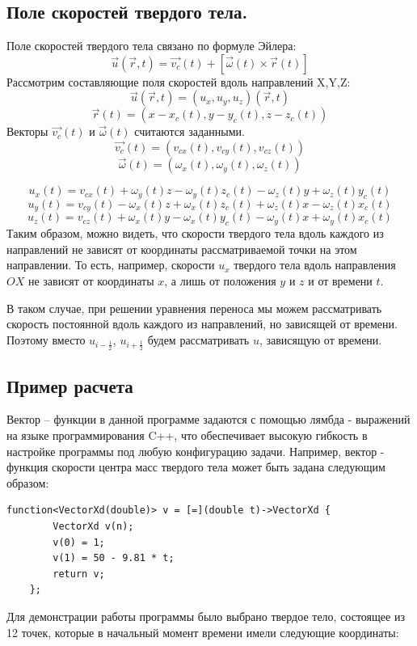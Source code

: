\documentclass[12pt,a4paper]{article}
\begin{document}
\subsection{Поле скоростей твердого тела.}
Поле скоростей твердого тела связано по формуле Эйлера:
\[
\overrightarrow{u}(\overrightarrow{r},t)=\overrightarrow{v_c}(t)+[\overrightarrow{\omega}(t)\times \overrightarrow{r}(t)]
\]
Рассмотрим составляющие поля скоростей вдоль направлений X,Y,Z:
\[ \overrightarrow{u}(\overrightarrow{r},t)=(u_x, u_y, u_z)(\overrightarrow{r},t) \]
\[ \overrightarrow{r}(t)=(x-x_c(t), y-y_c(t), z-z_c(t)) \]
Векторы $\overrightarrow{v_c}(t)$ и $\overrightarrow{\omega}(t)$ считаются заданными.
\[ \overrightarrow{v_c}(t)=(v_{cx}(t), v_{cy}(t), v_{cz}(t)) \]
\[ \overrightarrow{\omega}(t)=(\omega_x(t), \omega_y(t), \omega_z(t)) \]

\[ u_x(t)=v_{cx}(t)+\omega_y(t)z-\omega_y(t)z_c(t)-\omega_z(t)y+\omega_z(t)y_c(t) \]
\[ u_y(t)=v_{cy}(t)-\omega_x(t)z+\omega_x(t)z_c(t)+\omega_z(t)x-\omega_z(t)x_c(t) \]
\[ u_z(t)=v_{cz}(t)+\omega_x(t)y-\omega_x(t)y_c(t)-\omega_y(t)x+\omega_y(t)x_c(t) \]
Таким образом, можно видеть, что скорости твердого тела вдоль каждого из направлений не зависят от координаты рассматриваемой точки на этом направлении. То есть, например, скорости $u_x$ твердого тела вдоль направления $OX$ не зависят от координаты $x$, а лишь от положения $y$ и $z$ и от времени $t$.

В таком случае, при решении уравнения переноса мы можем рассматривать скорость постоянной вдоль каждого из направлений, но зависящей от времени. Поэтому вместо $u_{i-\frac{1}{2}}$, $u_{i+\frac{1}{2}}$ будем рассматривать $u$, зависящую от времени.

\subsection{Пример расчета}
Вектор – функции в данной программе задаются с помощью лямбда - выражений на языке программирования C++, что обеспечивает высокую гибкость в настройке программы под любую конфигурацию задачи. Например, вектор - функция скорости центра масс твердого тела может быть задана следующим образом:
\begin{lstlisting}
function<VectorXd(double)> v = [=](double t)->VectorXd {
        VectorXd v(n);
        v(0) = 1;
        v(1) = 50 - 9.81 * t;
        return v;
    };
\end{lstlisting}
Для демонстрации работы программы было выбрано твердое тело, состоящее из 12 точек, которые в начальный момент времени имели следующие координаты:
\end{document}
